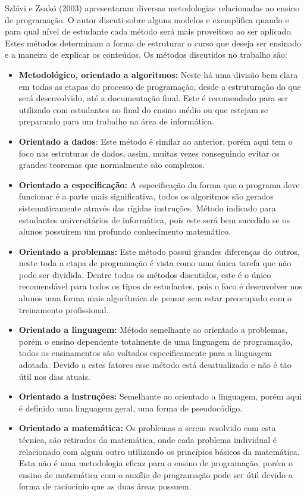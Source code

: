 \nocite{methods}
Szlávi e Zsakó (2003) apresentaram diversas metodologias relacionadas ao ensino de programação. O autor discuti sobre alguns modelos e exemplifica quando e para qual nível de estudante cada método será mais proveitoso ao ser aplicado. Estes métodos determinam a forma de estruturar o curso que deseja ser ensinado e a maneira de explicar os conteúdos. Os métodos discutidos no trabalho são:

\begin{itemize}
\itemsep0em
\item \textbf{Metodológico, orientado a algoritmos:} Neste há uma divisão bem clara em todas as etapas do processo de programação, desde a estruturação do que será desenvolvido, até a documentação final. Este é recomendado para ser utilizado com estudantes no final do ensino médio ou que estejam se preparando para um trabalho na área de informática.
\item \textbf{Orientado a dados}: Este método é similar ao anterior, porém aqui tem o foco nas estruturas de dados, assim, muitas vezes conseguindo evitar os grandes teoremas que normalmente são complexos.
\item \textbf{Orientado a especificação:} A especificação da forma que o programa deve funcionar é a parte mais significativa, todos os algoritmos são gerados sistematicamente através das rígidas instruções. Método indicado para estudantes universitários de informática, pois este será bem sucedido se os alunos possuírem um profundo conhecimento matemático.
\item \textbf{Orientado a problemas:} Este método possui grandes diferenças do outros, neste toda a etapa de programação é vista como uma única tarefa que não pode ser dividida. Dentre todos os métodos discutidos, este é o único recomendável para todos os tipos de estudantes, pois o foco é desenvolver nos alunos uma forma mais algorítmica de pensar sem estar preocupado com o treinamento profissional.
\item \textbf{Orientado a linguagem:} Método semelhante ao orientado a problemas, porém o ensino dependente totalmente de uma linguagem de programação, todos os ensinamentos são voltados especificamente para a linguagem adotada. Devido a estes fatores esse método está desatualizado e não é tão útil nos dias atuais.
\item \textbf{Orientado a instruções:} Semelhante ao orientado a linguagem, porém aqui é definido uma linguagem geral, uma forma de pseudocódigo.
\item \textbf{Orientado a matemática:} Os problemas a serem resolvido com esta técnica, são retirados da matemática, onde cada problema individual é relacionado com algum outro utilizando os princípios básicos da matemática. Esta não é uma metodologia eficaz para o ensino de programação, porém o ensino de matemática com o auxílio de programação pode ser útil devido a forma de raciocínio que as duas áreas possuem.

\end{itemize}

